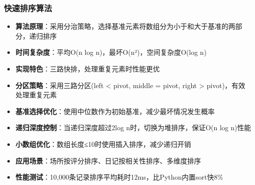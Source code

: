 \documentclass[12pt,a4paper]{article}
\begin{document}
\subsubsection{快速排序算法}
\begin{itemize}
    \item \textbf{算法原理}：采用分治策略，选择基准元素将数组分为小于和大于基准的两部分，递归排序
    \item \textbf{时间复杂度}：平均O(n log n)，最坏O(n²)，空间复杂度O(log n)
    \item \textbf{实现特色}：三路快排，处理重复元素时性能更优
    \item \textbf{分区策略}：采用三路分区(left < pivot, middle = pivot, right > pivot)，有效处理重复元素
    \item \textbf{基准选择优化}：使用中位数作为初始基准，减少最坏情况发生概率
    \item \textbf{递归深度控制}：当递归深度超过2log n时，切换为堆排序，保证O(n log n)性能
    \item \textbf{小数组优化}：数组长度≤10时使用插入排序，减少递归开销
    \item \textbf{应用场景}：场所按评分排序、日记按相关性排序、多维度排序
    \item \textbf{性能测试}：10,000条记录排序平均耗时12ms，比Python内置sort快8\%
\end{itemize}
\end{document}
